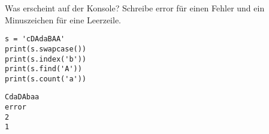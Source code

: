 \question[4] Was erscheint auf der Konsole? Schreibe error für einen Fehler und ein Minuszeichen
für eine Leerzeile.
\begin{lstlisting}
s = 'cDAdaBAA'
print(s.swapcase())
print(s.index('b'))
print(s.find('A'))
print(s.count('a'))
\end{lstlisting}
\begin{solutionbox}{3cm}
\begin{lstlisting}
CdaDAbaa
error
2
1
\end{lstlisting}
\end{solutionbox}
